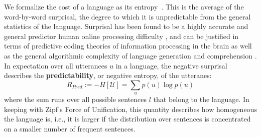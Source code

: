 \documentclass[9pt,twocolumn,twoside,lineno]{pnas-new}
\newcommand{\key}[1]{\textbf{#1}}
\begin{document}
We formalize the cost of a language as its entropy~\cite{ferreri2003least,ferrericancho2007global,futrell2017memory}.
This is the average of the word-by-word surprisal, the degree to which it is unpredictable from the general statistics of the language.
Surprisal has been found to be a highly accurate and general predictor human online processing difficulty \cite{hale2001probabilistic,levy2008expectation,smith2013effect}, and can be justified  in terms of predictive coding theories of information processing in the brain \cite{friston2009predictive} as well as the general algorithmic complexity of language generation and comprehension \cite{li2008introduction}.
In expectation over all utterances $u$ in a language, the negative surprisal describes the \key{predictability}, or negative entropy, of the utteranes: %
\begin{equation}
	R_{Pred} := - H[\mathcal{U}] = \sum_{u} p(u) \log p(u)
\end{equation}
where the sum runs over all possible sentences $l$ that belong to the language.
In keeping with Zipf's Force of Unification, this quantity describes how homogeneous the language is, i.e., it is larger if the distribution over sentences is concentrated on a smaller number of frequent sentences. %




\end{document}
